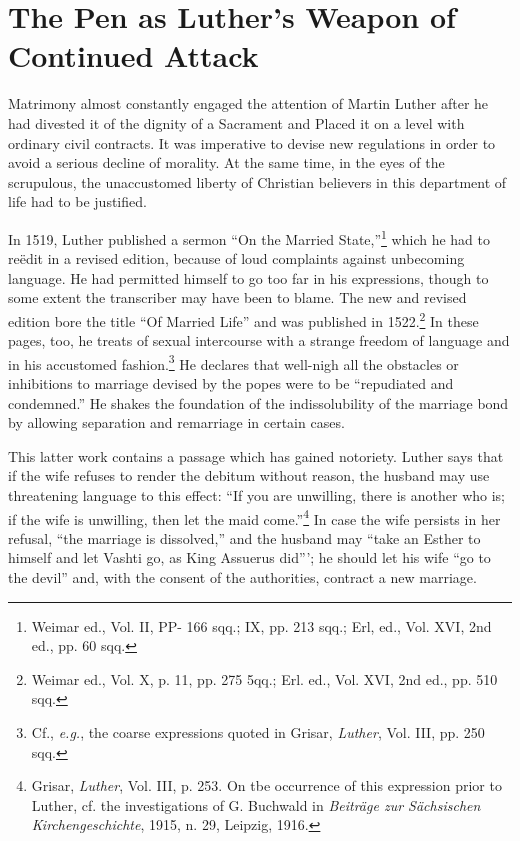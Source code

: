 \section{The Pen as Luther’s Weapon of Continued Attack}

Matrimony almost constantly engaged the attention of Martin
Luther after he had divested it of the dignity of a Sacrament and
Placed it on a level with ordinary civil contracts. It was imperative
to devise new regulations in order to avoid a serious decline of
morality. At the same time, in the eyes of the scrupulous, the unaccustomed
liberty of Christian believers in this department of life
had to be justified.

In 1519, Luther published a sermon “On the Married State,”\footnote
{Weimar ed., Vol. II, PP- 166 sqq.; IX, pp. 213 sqq.; Erl, ed., Vol. XVI, 2nd ed., pp.
60 sqq.}
which he had to reëdit in a revised edition, because of loud complaints
against unbecoming language. He had permitted himself
to go too far in his expressions, though to some extent the transcriber
may have been to blame. The new and revised edition bore the title
“Of Married Life” and was published in 1522.\footnote
{Weimar ed., Vol. X, p. 11, pp. 275 5qq.; Erl. ed., Vol. XVI, 2nd ed., pp. 510 sqq.}
In these pages,
too, he treats of sexual intercourse with a strange freedom of language
and in his accustomed fashion.\footnote
{Cf., \textit{e.g.}, the coarse expressions quoted in Grisar, \textit{Luther}, Vol. III, pp. 250 sqq.}
He declares that well-nigh all the
obstacles or inhibitions to marriage devised by the popes were to
be “repudiated and condemned.” He shakes the foundation of the
indissolubility of the marriage bond by allowing separation and remarriage
in certain cases.

This latter work contains a passage which has gained notoriety. Luther
says that if the wife refuses to render the debitum without reason, the
husband may use threatening language to this effect: “If you are unwilling,
there is another who is; if the wife is unwilling, then let the maid come.”\footnote
{Grisar, \textit{Luther}, Vol. III, p. 253. On tbe occurrence of this expression prior to Luther,
cf. the investigations of G. Buchwald in \textit{Beiträge zur Sächsischen Kirchengeschichte}, 1915,
n. 29, Leipzig, 1916.}
In case the wife persists in her refusal, “the marriage is dissolved,” and the
husband may “take an Esther to himself and let Vashti go, as King Assuerus
did”’; he should let his wife “go to the devil” and, with the consent of the
authorities, contract a new marriage.

